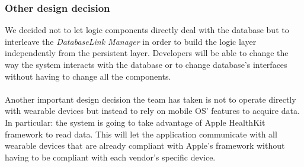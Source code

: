 \documentclass[DD.tex]{subfiles}
\begin{document}
\subsubsection{Other design decision}
We decided not to let logic components directly deal with the database but to interleave the \textit{DatabaseLink Manager} in order to build the logic layer independently from the persistent layer. Developers will be able to change the way the system interacts with the database or to change database's interfaces without having to change all the components. \\\\
Another important design decision the team has taken is not to operate directly with wearable devices but instead to rely on mobile OS' features to acquire data. In particular: the system is going to take advantage of Apple HealthKit framework to read data. This will let the application communicate with all wearable devices that are already compliant with Apple's framework without having to be compliant with each vendor's specific device.
\end{document}
